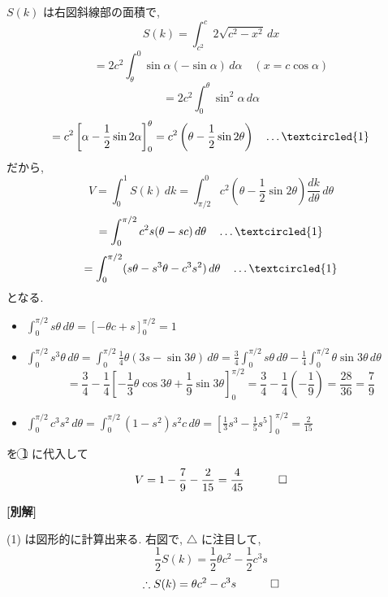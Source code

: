 \documentclass[../main.tex]{subfiles}
\begin{document}
\noindent
$S(k)$ は右図斜線部の面積で,
\[
  S(k) = \int_{c^2}^c 2\sqrt{c^2 - x^2} \, dx
\]
\[
  = 2c^2 \int_\theta^0 \sin\alpha (-\sin\alpha) \, d\alpha \quad (x = c\cos\alpha)
\]
\[
  = 2c^2 \int_0^\theta \sin^2\alpha \, d\alpha
\]
\[
  = c^2 \left[ \alpha - \frac{1}{2}\sin 2\alpha \right]_0^\theta = c^2 \left(\theta - \frac{1}{2}\sin 2\theta\right) \quad \dots \textcircled{1}
\]
だから,
\[
  V = \int_0^1 S(k) \, dk = \int_{\pi/2}^0 c^2 \left(\theta - \frac{1}{2}\sin 2\theta\right) \frac{dk}{d\theta} \, d\theta
\]
\[
  = \int_0^{\pi/2} c^2 s (\theta - s c) \, d\theta \quad \dots \textcircled{1}
\]
\[
  = \int_0^{\pi/2} (s \theta - s^3 \theta - c^3 s^2) \, d\theta \quad \dots \textcircled{1}
\]
となる.

\begin{itemize}
  \item $\displaystyle \int_0^{\pi/2} s \theta \, d\theta = [ -\theta c + s ]_0^{\pi/2} = 1$
  \item $\displaystyle \int_0^{\pi/2} s^3 \theta \, d\theta = \int_0^{\pi/2} \frac{1}{4} \theta (3s - \sin 3\theta) \, d\theta = \frac{3}{4} \int_0^{\pi/2} s \theta \, d\theta - \frac{1}{4} \int_0^{\pi/2} \theta \sin 3\theta \, d\theta$
    \[
      = \frac{3}{4} - \frac{1}{4} \left[ -\frac{1}{3}\theta \cos 3\theta + \frac{1}{9}\sin 3\theta \right]_0^{\pi/2} = \frac{3}{4} - \frac{1}{4}\left(-\frac{1}{9}\right) = \frac{28}{36} = \frac{7}{9}
    \]
  \item $\displaystyle \int_0^{\pi/2} c^3 s^2 \, d\theta = \int_0^{\pi/2} (1-s^2) s^2 c \, d\theta = \left[ \frac{1}{3}s^3 - \frac{1}{5}s^5 \right]_0^{\pi/2} = \frac{2}{15}$
\end{itemize}

\noindent
を \textcircled{1} に代入して
\[
  V = 1 - \frac{7}{9} - \frac{2}{15} = \frac{4}{45} \quad \hfill \qed
\]

\bigskip

\noindent
\textbf{[別解]}

\noindent
(1) は図形的に計算出来る. 右図で, $\triangle$ に注目して,
\[
  \frac{1}{2} S(k) = \frac{1}{2} \theta c^2 - \frac{1}{2} c^3 s
\]
\[
  \therefore S(k) = \theta c^2 - c^3 s \quad \hfill \qed
\]
\end{document}
